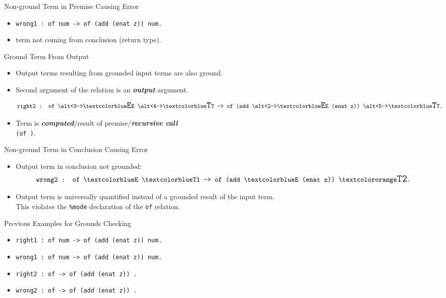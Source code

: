 \documentclass{beamer}
\renewcommand{\emph}[1]{\textbf{\textit{#1}}}
\begin{document}
\begin{frame}{Non-ground Term in Premise Causing Error}
\begin{itemize}
\item
\texttt{wrong1 : of  num -> of (add  (enat z)) num.}

\item {} term not coming from conclusion (return type).
\end{itemize}
\end{frame}


\begin{frame}{Ground Term From Output}
\begin{itemize}
\item Output terms resulting from grounded input terms
are also ground.

\item
Second argument of the \texttt{} relation is an
\emph{output} argument.
  
\[
\texttt{right2 : of
                   \alt<3->{\gtrmbig{E}}{{E}}
                   \alt<4->{\gtrmbig{T}}{T} ->
                 of (add \alt<2->{\gtrmbig{E}}{E}
                          (enat z))
                    \alt<5->{\gtrmbig{T}}{T}.}
\]

\item<4->
Term  is \emph{computed}/result of
premise/\emph{recursive call} \\
\texttt{(of )}.
\end{itemize}
\end{frame}


\begin{frame}{Non-ground Term in Conclusion Causing Error}
\begin{itemize}
\item Output term in conclusion not grounded:
\[
\texttt{wrong2 :
          of \gtrm{E} \gtrm{T1} ->
          of (add \gtrm{E} (enat z)) \utrmbig{T2}.}
\]

\item Output term  is universally quantified
instead of a grounded result of the input term. \\
This violates the \texttt{\%mode} declaration
of the \texttt{of} relation.
\end{itemize}
\end{frame}


\begin{frame}{Previous Examples for Grounds Checking}
\begin{itemize}
\item
\texttt{right1 : of  num -> of (add  (enat z)) num.}

\item
\texttt{wrong1 : of  num -> of (add  (enat z)) num.}

\item
\texttt{right2 : of  -> of (add  (enat z)) .}

\item
\texttt{wrong2 : of  -> of (add  (enat z)) .}
\end{itemize}
\end{frame}
\end{document}
